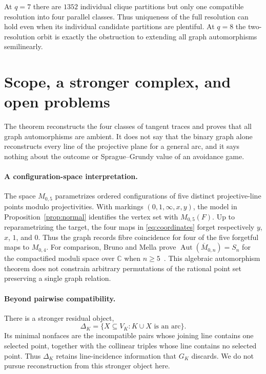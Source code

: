 \documentclass[11pt]{article}
\theoremstyle{definition}
\theoremstyle{remark}
\newcommand{\Aut}{\operatorname{Aut}}
\begin{document}
At $q=7$ there are $1352$ individual clique partitions but only one
compatible resolution into four parallel classes. Thus uniqueness of the full resolution
can hold even when its individual candidate partitions are plentiful.
At $q=8$ the two-resolution orbit is exactly the obstruction to extending
all graph automorphisms semilinearly.

\section{Scope, a stronger complex, and open problems}
\label{sec:remarks}

The theorem reconstructs the four classes of tangent traces and proves that
all graph automorphisms are ambient.  It does not say that the binary graph
alone reconstructs every line of the projective plane for a general arc,
and it says nothing about the outcome or Sprague--Grundy value of an
avoidance game.

\paragraph{A configuration-space interpretation.}
The space $M_{0,5}$ parametrizes ordered configurations of five distinct
projective-line points modulo projectivities. With markings
$(0,1,\infty,x,y)$, the model in Proposition~\ref{prop:normal} identifies the
vertex set with $M_{0,5}(F)$. Up to reparametrizing the target, the four
maps in \eqref{eq:coordinates} forget respectively $y$, $x$, $1$, and $0$. Thus the graph
records fibre coincidence for four of the five forgetful maps to $M_{0,4}$.
For comparison, Bruno and Mella prove
$\Aut(\overline{M}_{0,n})=S_n$ for the compactified moduli space over
$\mathbb C$ when $n\ge5$~\cite[Theorem 3]{BrunoMella}. This algebraic
automorphism theorem does not constrain arbitrary permutations of the
rational point set preserving a single graph relation.

\paragraph{Beyond pairwise compatibility.}
There is a stronger residual object,
\[
 \Delta_K=\{X\subseteq V_K:K\cup X\text{ is an arc}\}.
\]
Its minimal nonfaces are the incompatible pairs whose joining line contains
one selected point, together with the collinear triples whose line contains
no selected point.  Thus $\Delta_K$ retains line-incidence information that
$G_K$ discards.  We do not pursue reconstruction from this stronger object here.
\end{document}
